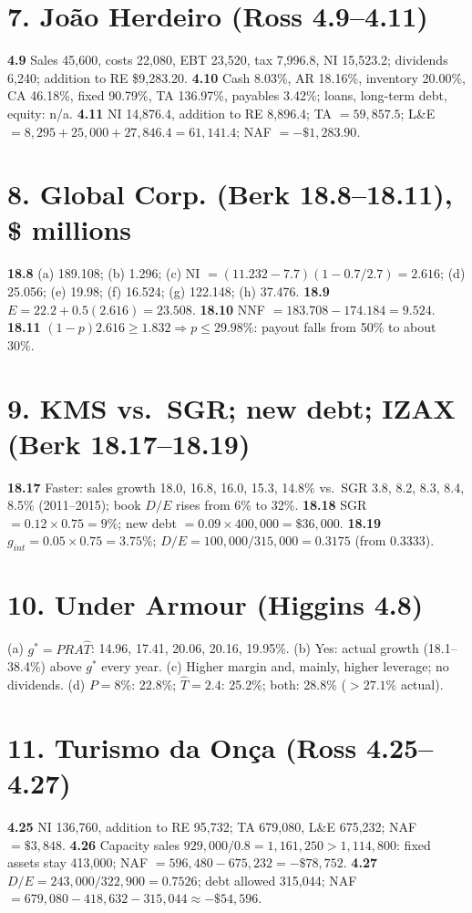 \documentclass[11pt,a4paper]{article}
\begin{document}
\section*{7. Jo\~ao Herdeiro (Ross 4.9--4.11)}
\textbf{4.9} Sales 45,600, costs 22,080, EBT 23,520, tax 7,996.8, NI 15,523.2; dividends 6,240; addition to RE
\$9,283.20. \textbf{4.10} Cash 8.03\%, AR 18.16\%, inventory 20.00\%, CA 46.18\%, fixed 90.79\%, TA 136.97\%,
payables 3.42\%; loans, long-term debt, equity: n/a. \textbf{4.11} NI 14,876.4, addition to RE 8,896.4;
TA $=59{,}857.5$; L\&E $=8{,}295+25{,}000+27{,}846.4=61{,}141.4$; NAF $=-\$1{,}283.90$.

\section*{8. Global Corp. (Berk 18.8--18.11), \$ millions}
\textbf{18.8} (a) 189.108; (b) 1.296; (c) NI $=(11.232-7.7)(1-0.7/2.7)=2.616$; (d) 25.056; (e) 19.98;
(f) 16.524; (g) 122.148; (h) 37.476. \textbf{18.9} $E=22.2+0.5(2.616)=23.508$.
\textbf{18.10} NNF $=183.708-174.184=9.524$. \textbf{18.11} $(1-p)2.616\ge1.832\Rightarrow p\le29.98\%$: payout
falls from 50\% to about 30\%.

\section*{9. KMS vs.\ SGR; new debt; IZAX (Berk 18.17--18.19)}
\textbf{18.17} Faster: sales growth 18.0, 16.8, 16.0, 15.3, 14.8\% vs.\ SGR 3.8, 8.2, 8.3, 8.4, 8.5\% (2011--2015);
book $D/E$ rises from 6\% to 32\%. \textbf{18.18} SGR $=0.12\times0.75=9\%$; new debt $=0.09\times400{,}000=\$36{,}000$.
\textbf{18.19} $g_{int}=0.05\times0.75=3.75\%$; $D/E=100{,}000/315{,}000=0.3175$ (from 0.3333).

\section*{10. Under Armour (Higgins 4.8)}
(a) $g^*=PRA\hat T$: 14.96, 17.41, 20.06, 20.16, 19.95\%. (b) Yes: actual growth (18.1--38.4\%) above $g^*$
every year. (c) Higher margin and, mainly, higher leverage; no dividends. (d) $P=8\%$: 22.8\%;
$\hat T=2.4$: 25.2\%; both: 28.8\% ($>27.1\%$ actual).

\section*{11. Turismo da On\c{c}a (Ross 4.25--4.27)}
\textbf{4.25} NI 136,760, addition to RE 95,732; TA 679,080, L\&E 675,232; NAF $=\$3{,}848$.
\textbf{4.26} Capacity sales $929{,}000/0.8=1{,}161{,}250>1{,}114{,}800$: fixed assets stay 413,000; NAF $=596{,}480-675{,}232=-\$78{,}752$.
\textbf{4.27} $D/E=243{,}000/322{,}900=0.7526$; debt allowed 315,044; NAF $=679{,}080-418{,}632-315{,}044\approx-\$54{,}596$.
\end{document}
